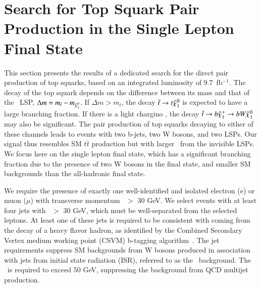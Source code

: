 \section{Search for Top Squark Pair Production in the Single Lepton Final State}
\label{sec:stop}

This section presents the results of a dedicated search for the direct pair production of top squarks, based on an integrated luminosity of 9.7~fb$^{-1}$.
The decay of the top squark depends on the difference between its mass and that of the \lsp\ LSP,
$\Delta m = m_{\tilde{t}}-m_{\tilde{\chi}_{1}^{0}}$. If $\Delta m > m_{t}$, the decay $\tilde{t}\to t\tilde{\chi}_{1}^{0}$ is expected
to have a large branching fraction. If there is a light chargino \chipm, the decay 
$\tilde{t}\to b\tilde{\chi}_{1}^{+}\to b W \tilde{\chi}_{1}^{0}$ may also be significant.
The pair production of top squarks decaying to either of these channels leads to events with two b-jets, two W bosons,
and two LSPs. Our signal thus resembles SM $t\bar{t}$ production but with larger \met\ from
the invisible LSPs.
We focus here on the single lepton final state, which has a significant branching fraction due to the presence of two W bosons
in the final state,
and smaller SM backgrounds than the all-hadronic final state.


We require the presence of exactly one well-identified and isolated electron (e) or muon ($\mu$) with transverse
momentum \pt\ $>$ 30 GeV. 
We select events with at least four jets with \pt\ $>$ 30 GeV,
which must be well-separated from the selected leptons.
At least one of these jets is required to be consistent with coming from the decay of a heavy flavor hadron, as
identified by the Combined Secondary Vertex medium working point (CSVM) b-tagging algorithm~\cite{ref:btag}.
The jet requirements suppress SM backgrounds from W bosons produced in association with jets from initial state
radiation (ISR), referred to as the \wjets\ background. 
The \met\ is required to exceed 50 GeV, suppressing the background from QCD multijet production.


